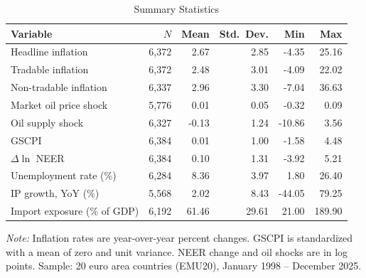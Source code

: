 \documentclass[a4paper,12pt]{article}
\begin{document}
\begin{table}[htbp]
  \centering
  \begin{threeparttable}
  \caption{Summary Statistics}
  \label{tab:summary}
  \footnotesize
  \begin{tabular*}{\textwidth}{@{\extracolsep{\fill}}lrrrrr}
    \toprule
    Variable & $N$ & Mean & Std.\ Dev. & Min & Max \\
    \midrule
    Headline inflation & 6,372 & 2.67 & 2.85 & -4.35 & 25.16 \\
    Tradable inflation & 6,372 & 2.48 & 3.01 & -4.09 & 22.02 \\
    Non-tradable inflation & 6,337 & 2.96 & 3.30 & -7.04 & 36.63 \\
    Market oil price shock & 5,776 & 0.01 & 0.05 & -0.32 & 0.09 \\
    Oil supply shock & 6,327 & -0.13 & 1.24 & -10.86 & 3.56 \\
    GSCPI & 6,384 & 0.01 & 1.00 & -1.58 & 4.48 \\
    $\Delta \ln$ NEER & 6,384 & 0.10 & 1.31 & -3.92 & 5.21 \\
    Unemployment rate (\%) & 6,284 & 8.36 & 3.97 & 1.80 & 26.40 \\
    IP growth, YoY (\%) & 5,568 & 2.02 & 8.43 & -44.05 & 79.25 \\
    Import exposure (\% of GDP) & 6,192 & 61.46 & 29.61 & 21.00 & 189.90 \\
    \bottomrule
  \end{tabular*}
  \begin{tablenotes}
    \footnotesize
    \item \textit{Note:} Inflation rates are year-over-year percent changes. GSCPI is standardized with a mean of zero and unit variance. NEER change and oil shocks are in log points. Sample: 20 euro area countries (EMU20), January 1998 -- December 2025.
  \end{tablenotes}
  \end{threeparttable}
\end{table}
\end{document}
